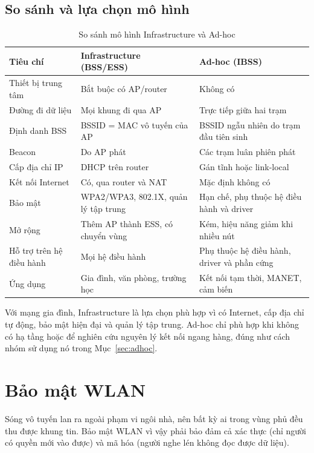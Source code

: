 \documentclass[12pt,a4paper]{article}
\numberwithin{figure}{section}
\numberwithin{table}{section}
\begin{document}
\subsection{So sánh và lựa chọn mô hình}
\begin{table}[H]
  \centering\small
  \caption{So sánh mô hình Infrastructure và Ad-hoc}
  \label{tab:sosanh}
  \begin{tabularx}{\linewidth}{@{}P{3.1cm} L L@{}}
    \toprule
    \textbf{Tiêu chí} & \textbf{Infrastructure (BSS/ESS)} & \textbf{Ad-hoc (IBSS)}\\
    \midrule
    Thiết bị trung tâm & Bắt buộc có AP/router & Không có\\
    Đường đi dữ liệu & Mọi khung đi qua AP & Trực tiếp giữa hai trạm\\
    Định danh BSS & BSSID = MAC vô tuyến của AP & BSSID ngẫu nhiên do trạm đầu tiên sinh\\
    Beacon & Do AP phát & Các trạm luân phiên phát\\
    Cấp địa chỉ IP & DHCP trên router & Gán tĩnh hoặc link-local\\
    Kết nối Internet & Có, qua router và NAT & Mặc định không có\\
    Bảo mật & WPA2/WPA3, 802.1X, quản lý tập trung & Hạn chế, phụ thuộc hệ điều hành và driver\\
    Mở rộng & Thêm AP thành ESS, có chuyển vùng & Kém, hiệu năng giảm khi nhiều nút\\
    Hỗ trợ trên hệ điều hành & Mọi hệ điều hành & Phụ thuộc hệ điều hành, driver và phần cứng\\
    Ứng dụng & Gia đình, văn phòng, trường học & Kết nối tạm thời, MANET, cảm biến\\
    \bottomrule
  \end{tabularx}
\end{table}

Với mạng gia đình, Infrastructure là lựa chọn phù hợp vì có Internet, cấp
địa chỉ tự động, bảo mật hiện đại và quản lý tập trung. Ad-hoc chỉ phù hợp khi
không có hạ tầng hoặc để nghiên cứu nguyên lý kết nối ngang hàng, đúng như
cách nhóm sử dụng nó trong Mục~\ref{sec:adhoc}.

\section{Bảo mật WLAN}
\label{sec:baomat}
Sóng vô tuyến lan ra ngoài phạm vi ngôi nhà, nên bất kỳ ai trong vùng phủ đều
thu được khung tin. Bảo mật WLAN vì vậy phải bảo đảm cả xác thực (chỉ người có
quyền mới vào được) và mã hóa (người nghe lén không đọc được dữ liệu).
\end{document}
